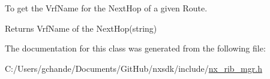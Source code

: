 To get the Vrf\+Name for the Next\+Hop of a given Route.

\begin{DoxyReturn}{Returns}
Vrf\+Name of the Next\+Hop(string)
\end{DoxyReturn}

 

The documentation for this class was generated from the following file\+:\begin{DoxyCompactItemize}
\item 
C\+:/\+Users/gchande/\+Documents/\+Git\+Hub/nxsdk/include/\mbox{\hyperlink{nx__rib__mgr_8h}{nx\+\_\+rib\+\_\+mgr.\+h}}\end{DoxyCompactItemize}
